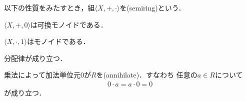 \documentclass{ltjsbook}
\begin{document}
\begin{thmbox}
\begin{definition} 以下の性質をみたすとき，組\(\langle X, \mathord{+}, \mathord{\cdot} \rangle\)を(semiring)という．
\begin{conditions}
    \item \(\langle X, \mathord{+}, 0 \rangle\)は可換モノイドである．
    \item \(\langle X, \mathord{\cdot}, 1 \rangle\)はモノイドである．
    \item 分配律が成り立つ．
    \item 乗法によって加法単位元\(0\)が\(R\)を(annihilate)．すなわち
        任意の\(a \in R\)について
        \begin{align}
            0 \cdot a = a \cdot 0 = 0
        \end{align}
        が成り立つ．
\end{conditions}
\end{definition}
\end{thmbox}
\end{document}
